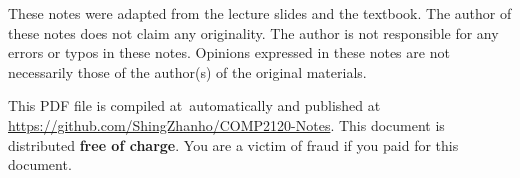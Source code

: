 \begin{remark}
    
These notes were adapted from the lecture slides and the textbook. The author of these notes
does not claim any originality. The author is not responsible for any errors or typos in these notes.
Opinions expressed in these notes are not necessarily those of the author(s) of the original materials.

This PDF file is compiled at \DTMnow\,automatically and published at 
\textcolor{blue}{\url{https://github.com/ShingZhanho/COMP2120-Notes}}.
This document is distributed \textbf{free of charge}. You are a victim of fraud if you paid for this document.

\end{remark}